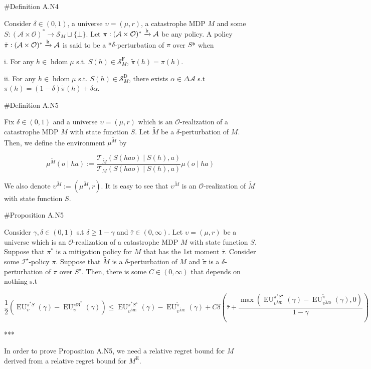 \documentclass[a4paper]{article}
\newcommand{\AP}[1]{\left(#1\right)}
\newcommand{\M}{\xrightarrow{\textnormal{k}}}
\newcommand{\Ob}{\mathcal{O}}
\newcommand{\A}{\mathcal{A}}
\newcommand{\St}{\mathcal{S}}
\newcommand{\T}{\mathcal{T}}
\newcommand{\In}{\mathcal{I}}
\newcommand{\FH}{(\A \times \Ob)^*}
\DeclareMathOperator{\HD}{hdom}
\newcommand{\RMD}{\mathrm{D}}
\newcommand{\RME}{\mathrm{E}}
\newcommand{\RMF}{\mathrm{F}}
\newcommand{\SF}{\St^{\RMF}}
\newcommand{\SD}{\St^{\RMD}}
\newcommand{\ME}{M^{\RME}}
\newcommand{\EU}{\operatorname{EU}}
\begin{document}
\#Definition A.N4

Consider $\delta\in(0,1)$, a universe $\upsilon=(\mu,r)$, a catastrophe MDP $M$ and some $S: \FH \rightarrow \St_M \sqcup \{\bot\}$. Let $\pi: \FH \M \A$ be any policy. A policy $\tilde{\pi}: \FH \M \A$ is said to be a *$\delta$-perturbation of $\pi$ over $S$* when

i. For any $h \in \HD{\mu}$ s.t. $S(h)\in\SF_M$, $\tilde{\pi}(h)=\pi(h)$.

ii. For any $h \in \HD{\mu}$ s.t. $S(h)\in\SD_M$, there exists $\alpha\in\Delta\A$ s.t $\pi(h)=(1-\delta)\tilde{\pi}(h)+\delta\alpha$.

\#Definition A.N5

Fix $\delta\in(0,1)$ and a universe $\upsilon=(\mu,r)$ which is an $\Ob$-realization of a catastrophe MDP $M$ with state function $S$. Let $\tilde{M}$ be a $\delta$-perturbation of $M$. Then, we define the environment $\mu^{\tilde{M}}$ by

$$\mu^{\tilde{M}}(o \mid ha) := \frac{\T_{\tilde{M}}\AP{S(hao) \mid S(h),a}}{\T_{M}\AP{S(hao) \mid S(h),a}}\mu(o \mid ha)$$

We also denote $\upsilon^{\tilde{M}}:=\AP{\mu^{\tilde{M}},r}$. It is easy to see that $\upsilon^{\tilde{M}}$ is an $\Ob$-realization of $\tilde{M}$ with state function $S$.

\#Proposition A.N5

Consider $\gamma,\delta\in(0,1)$ s.t $\delta \geq 1 - \gamma$ and $\bar{\tau}\in(0,\infty)$. Let $\upsilon=(\mu,r)$ be a universe which is an $\Ob$-realization of a catastrophe MDP $M$ with state function $S$. Suppose that $\pi^*$ is a mitigation policy for $M$ that has the 1st moment $\bar{\tau}$. Consider some $\In^\star$-policy $\pi$. Suppose that $\tilde{M}$ is a $\delta$-perturbation of $M$ and $\tilde{\pi}$ is a $\delta$-perturbation of $\pi$ over $S^\star$. Then, there is some $C\in(0,\infty)$ that depends on nothing s.t

$$\frac{1}{2}\AP{\EU_{\upsilon}^{\pi^* S}(\gamma)-\EU_{\upsilon}^{\pi\Re^*}(\gamma)} \leq \EU_{\upsilon^{\tilde{M}\RME}}^{\pi^* S^\star}(\gamma)-\EU_{\upsilon^{\tilde{M}\RME}}^{\tilde{\pi}}(\gamma) + C\delta\AP{\bar{\tau}+\frac{\max\AP{\EU_{\upsilon^{\tilde{M}\RMD}}^{\pi^* S^\star}(\gamma)-\EU_{\upsilon^{\tilde{M}\RMD}}^{\tilde{\pi}}(\gamma),0}}{1-\gamma}}$$

***

In order to prove Proposition A.N5, we need a relative regret bound for $M$ derived from a relative regret bound for $\ME$.
\end{document}
